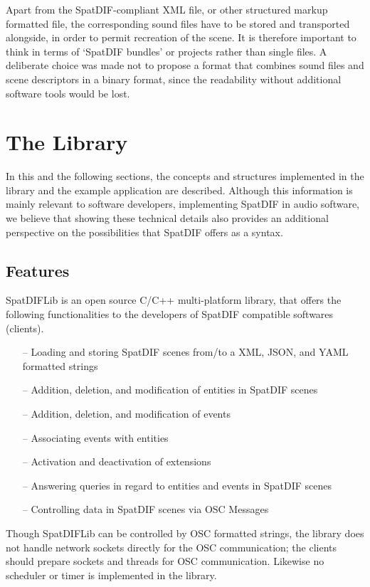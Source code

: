 \documentclass[a4paper]{article}
\begin{document}
Apart from the SpatDIF-compliant XML file, or other structured markup formatted file, the corresponding sound files have to be stored and transported alongside, in order to permit recreation of the scene.
It is therefore important to think in terms of `SpatDIF bundles' or projects rather than single files.
A deliberate choice was made not to propose a format that combines sound files and scene descriptors in a binary format, since the readability without additional software tools would be lost.

\section{The Library} %

In this and the following sections, the concepts and structures implemented in the library and the example application are described.
Although this information is mainly relevant to software developers, implementing SpatDIF in audio software, we believe that showing these technical details also provides an additional perspective on the possibilities that SpatDIF offers as a syntax.

\subsection{Features}
SpatDIFLib is an open source C/C++ multi-platform library, that offers the following functionalities to the developers of SpatDIF compatible softwares (clients).

\begin{itemize}[leftmargin=*]
\item[--] Loading and storing SpatDIF scenes from/to a XML, JSON, and YAML formatted strings
\item[--] Addition, deletion, and modification of entities in SpatDIF scenes
\item[--] Addition, deletion, and modification of events
\item[--] Associating events with entities
\item[--] Activation and deactivation of extensions
\item[--] Answering queries in regard to entities and events in SpatDIF scenes
\item[--] Controlling data in SpatDIF scenes via OSC Messages
\end{itemize}

Though SpatDIFLib can be controlled by OSC \cite{Wessel_2002, Schmeder_2008} formatted strings, the library does not handle network sockets directly for the OSC communication; the clients should prepare sockets and threads for OSC communication. Likewise no scheduler or timer is implemented in the library. 
  
\end{document}
